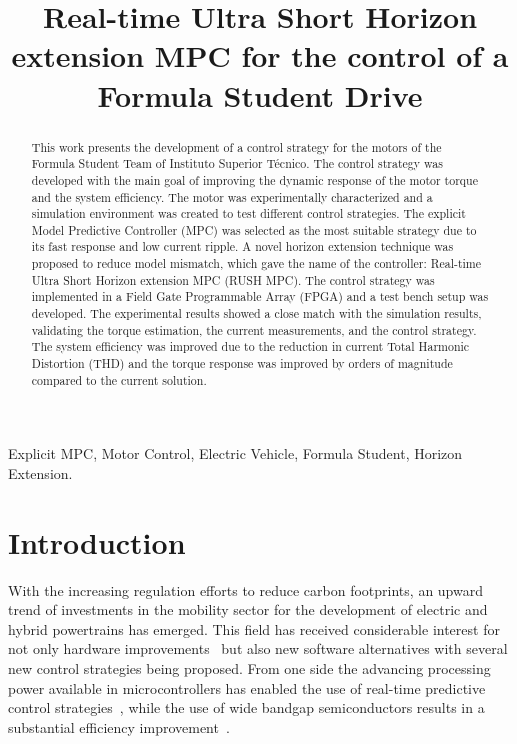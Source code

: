 \documentclass[9pt,conference]{IEEEtran}
\begin{document}
\title{Real-time Ultra Short Horizon extension MPC for the control of a Formula Student Drive\\}

\author{
}

\maketitle
\thispagestyle{plain}
\pagestyle{plain}
\begin{abstract}
	This work presents the development of a control strategy for the motors of the Formula Student Team of Instituto Superior Técnico. The control strategy was developed with the main goal of improving the dynamic response of the motor torque and the system efficiency. The motor was experimentally characterized and a simulation environment was created to test different control strategies. The explicit Model Predictive Controller (MPC) was selected as the most suitable strategy due to its fast response and low current ripple. A novel horizon extension technique was proposed to reduce model mismatch, which gave the name of the controller: Real-time Ultra Short Horizon extension MPC (RUSH MPC). The control strategy was implemented in a Field Gate Programmable Array (FPGA) and a test bench setup was developed. The experimental results showed a close match with the simulation results, validating the torque estimation, the current measurements, and the control strategy. The system efficiency was improved due to the reduction in current Total Harmonic Distortion (THD) and the torque response was improved by orders of magnitude compared to the current solution.
\end{abstract}

\begin{IEEEkeywords}
Explicit MPC, Motor Control, Electric Vehicle, Formula Student, Horizon Extension.
\end{IEEEkeywords}

\section{Introduction}
With the increasing regulation efforts to reduce carbon footprints, an upward trend of investments in the mobility sector for the development of electric and hybrid powertrains has emerged. This field has received considerable interest for not only hardware improvements~\cite{Wang:power_converter_review:2020} but also new software alternatives with several new control strategies being proposed. From one side the advancing processing power available in microcontrollers has enabled the use of real-time predictive control strategies~\cite{Karamanakos:MPC_in_power_electronics:2020}, while the use of wide bandgap semiconductors results in a substantial efficiency improvement~\cite{Palmour:wide_bandgap_efficiency:2006}.
\end{document}
